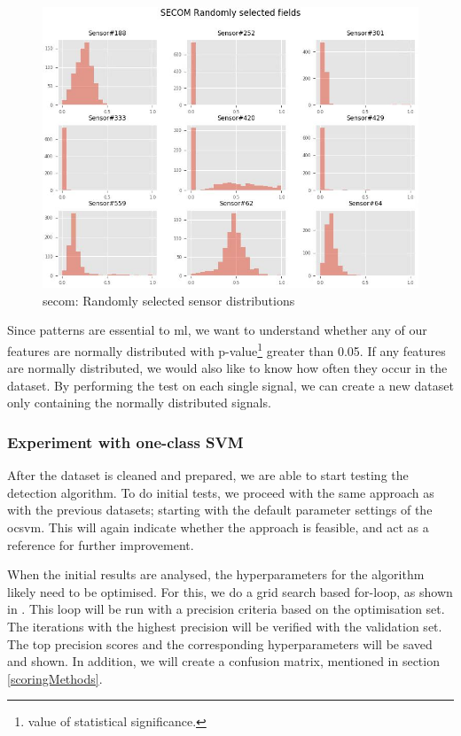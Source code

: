 \documentclass[english, a4paper]{report}
\begin{document}
{{{{                \begin{figure}[H]
                    \centering \includegraphics[width=\textwidth]{anom-SECOM-rand-fields}
                    \caption{\gls{secom}: Randomly selected sensor distributions}
                    \label{fig:secomRandDists}
                \end{figure}
                
                Since patterns are essential to \gls{ml}, we want to understand whether any of our features are normally distributed with p-value\footnote{value of statistical significance.} greater than 0.05. If any features are normally distributed, we would also like to know how often they occur in the dataset. By performing the test on each single signal, we can create a new dataset only containing the normally distributed signals.
            }
            
            \subsubsection{Experiment with one-class SVM}
            {
                After the dataset is cleaned and prepared, we are able to start testing the detection algorithm. To do initial tests, we proceed with the same approach as with the previous datasets; starting with the default parameter settings of the \gls{ocsvm}. This will again indicate whether the approach is feasible, and act as a reference for further improvement. 
                \par
                When the initial results are analysed, the hyperparameters for the algorithm likely need to be optimised. For this, we do a grid search based for-loop, as shown in . This loop will be run with a precision criteria based on the optimisation set. The iterations with the highest precision will be verified with the validation set. The top precision scores and the corresponding hyperparameters will be saved and shown. In addition, we will create a confusion matrix, mentioned in section \ref{scoringMethods}.
            }
        }
    }
    
}
\end{document}
